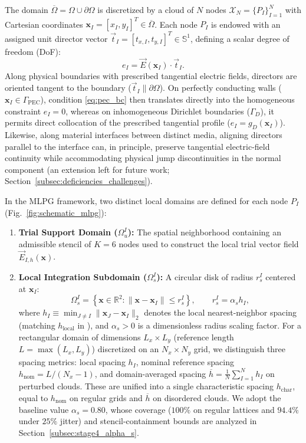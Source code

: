 \documentclass[VANCOUVER]{USG}
\begin{document}
The domain $\overline{\Omega} = \Omega \cup \partial\Omega$ is discretized by a cloud of $N$ nodes $\mathcal{X}_N = \{P_I\}_{I=1}^N$ with Cartesian coordinates $\mathbf{x}_I = [x_I, y_I]^T \in \overline{\Omega}$. Each node $P_I$ is endowed with an assigned unit director vector $\vec{t}_I = [t_{x,I}, t_{y,I}]^T \in \mathbb{S}^1$, defining a scalar degree of freedom (DoF):
\begin{equation}
    e_I = \vec{E}(\mathbf{x}_I) \cdot \vec{t}_I.
\end{equation}
Along physical boundaries with prescribed tangential electric fields, directors are oriented tangent to the boundary ($\vec{t}_I \parallel \partial\Omega$). On perfectly conducting walls ($\mathbf{x}_I \in \Gamma_{\mathrm{PEC}}$), condition \eqref{eq:pec_bc} then translates directly into the homogeneous constraint $e_I = 0$, whereas on inhomogeneous Dirichlet boundaries ($\Gamma_D$), it permits direct collocation of the prescribed tangential profile ($e_I = g_D(\mathbf{x}_I)$). Likewise, along material interfaces between distinct media, aligning directors parallel to the interface can, in principle, preserve tangential electric-field continuity while accommodating physical jump discontinuities in the normal component (an extension left for future work; Section~\ref{subsec:deficiencies_challenges}).

In the MLPG framework, two distinct local domains are defined for each node $P_I$ (Fig.~\ref{fig:schematic_mlpg}):
\begin{enumerate}
    \item \textbf{Trial Support Domain ($\Omega_u^I$):} The spatial neighborhood containing an admissible stencil of $K = 6$ nodes used to construct the local trial vector field $\vec{E}_{I,h}(\mathbf{x})$.
    \item \textbf{Local Integration Subdomain ($\Omega_s^I$):} A circular disk of radius $r_s^I$ centered at $\mathbf{x}_I$:
          \begin{equation}
              \Omega_s^I = \left\{ \mathbf{x} \in \mathbb{R}^2 : \|\mathbf{x} - \mathbf{x}_I\| \le r_s^I \right\}, \qquad r_s^I = \alpha_s h_I,
              \label{eq:subdomain_disk}
          \end{equation}
          where $h_I \equiv \min_{J \ne I} \|\mathbf{x}_J - \mathbf{x}_I\|_2$ denotes the local nearest-neighbor spacing (matching $h_{\mathrm{local}}$ in \cite{stable_vnmm2d_2026}), and $\alpha_s > 0$ is a dimensionless radius scaling factor. For a rectangular domain of dimensions $L_x \times L_y$ (reference length $L = \max(L_x, L_y)$) discretized on an $N_x \times N_y$ grid, we distinguish three spacing metrics: local spacing $h_I$, nominal reference spacing $h_{\mathrm{nom}} = L/(N_x - 1)$, and domain-averaged spacing $\overline{h} = \frac{1}{N}\sum_{I=1}^N h_I$ on perturbed clouds. These are unified into a single characteristic spacing $h_{\mathrm{char}}$, equal to $h_{\mathrm{nom}}$ on regular grids and $\overline{h}$ on disordered clouds. We adopt the baseline value $\alpha_s = 0.80$, whose coverage ($100\%$ on regular lattices and $94.4\%$ under $25\%$ jitter) and stencil-containment bounds are analyzed in Section~\ref{subsec:stage4_alpha_s}.
\end{enumerate}
\end{document}
